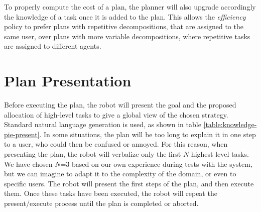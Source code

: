 To properly compute the cost of a plan, the planner will also upgrade accordingly the knowledge of a task once it is added to the plan. This allows the \textit{efficiency} policy to prefer plans with repetitive decompositions, that are assigned to the same user, over plans with more variable decompositions, where repetitive tasks are assigned to different agents.



\section{Plan Presentation}
\label{sec:knowledge-plan_presentation}
Before executing the plan, the robot will present the goal and the proposed allocation of high-level tasks to give a global view of the chosen strategy. Standard natural language generation is used, as shown in table \ref{table:knowledge-pie-present}. 
In some situations, the plan will be too long to explain it in one step to a user, who could then be confused or annoyed. For this reason, when presenting the plan, the robot will verbalize only the first $N$  highest level tasks. We have chosen $N$=$3$ based on our own experience during tests with the system, but we can imagine to adapt it to the complexity of the domain, or even to specific users. The robot will present the first steps of the plan, and then execute them. Once these tasks have been executed, the robot will repeat the present/execute process until the plan is completed or aborted.
 
